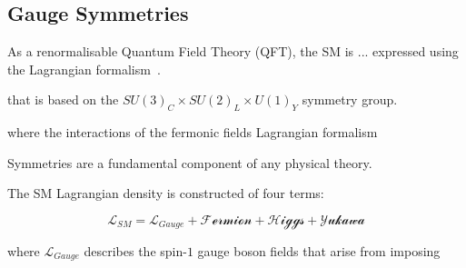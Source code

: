 \begin{table}[htbp]
\label{tab:bosons}
  \centering
\end{table}	

\subsection{Gauge Symmetries}\label{subsec:gaugeSymmetries}
As a renormalisable Quantum Field Theory (QFT), the SM is ... expressed using the Lagrangian formalism~\cite{LagrangiansSM}.


that is based on the $SU(3)_{C} \times SU(2)_{L} \times U(1)_{Y}$ symmetry group.



 where the interactions of the fermonic fields 
Lagrangian formalism


Symmetries are a fundamental component of any physical theory.

The SM Lagrangian density is constructed of four terms:

\begin{equation}
\mathcal{L}_{SM} = \mathcal{L}_{Gauge} + \mathcal{Fermion} + \mathcal{Higgs} + \mathcal{Yukawa}
\end{equation}

where $\mathcal{L}_{Gauge}$ describes the spin-$1$ gauge boson fields that arise from imposing 


